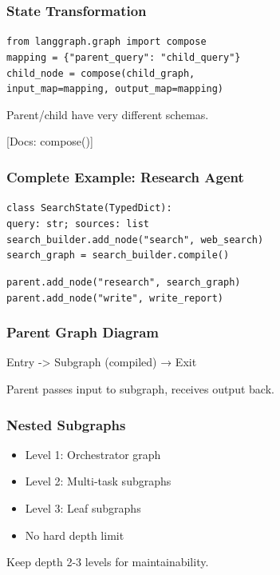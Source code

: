 \documentclass[aspectratio=169,11pt]{beamer}
\newcommand{\docref}[1]{{\scriptsize\color{docgray}[Docs: #1]}}
\begin{document}
\begin{frame}
\frametitle{State Transformation}
\begin{tipbox}
\texttt{from langgraph.graph import compose}\\
\texttt{mapping = \{"parent\_query": "child\_query"\}}\\
\texttt{child\_node = compose(child\_graph,}\\
\texttt{input\_map=mapping, output\_map=mapping)}
\end{tipbox}
\vspace{0.1cm}
\begin{tipbox}
Parent/child have very different schemas.
\end{tipbox}
\docref{compose()}
\end{frame}

\begin{frame}
\frametitle{Complete Example: Research Agent}
\begin{tipbox}
\texttt{class SearchState(TypedDict):}\\
\texttt{query: str; sources: list}\\
\texttt{search\_builder.add\_node("search", web\_search)}\\
\texttt{search\_graph = search\_builder.compile()}
\end{tipbox}
\vspace{0.1cm}
\begin{tipbox}
\texttt{parent.add\_node("research", search\_graph)}\\
\texttt{parent.add\_node("write", write\_report)}
\end{tipbox}
\end{frame}

\begin{frame}
\frametitle{Parent Graph Diagram}
\begin{tipbox}[Hierarchy]
Entry -> Subgraph (compiled) → Exit
\end{tipbox}
\vspace{0.1cm}
\begin{conceptbox}
Parent passes input to subgraph, receives output back.
\end{conceptbox}
\end{frame}

\begin{frame}
\frametitle{Nested Subgraphs}
\begin{conceptbox}
\setlength{\itemsep}{1pt}
\begin{itemize}
\item Level 1: Orchestrator graph
\item Level 2: Multi-task subgraphs
\item Level 3: Leaf subgraphs
\item No hard depth limit
\end{itemize}
\end{conceptbox}
\vspace{0.1cm}
\begin{tipbox}
Keep depth 2-3 levels for maintainability.
\end{tipbox}
\end{frame}
\end{document}
